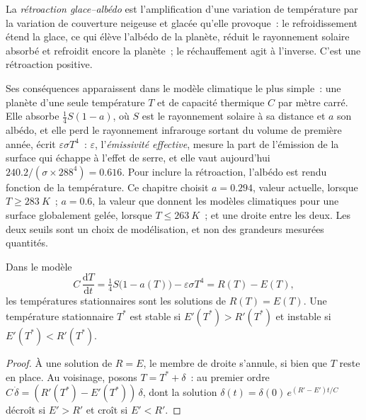 \begin{definition}\label{def:b2:precambrian-earth:ice-albedo}
La \emph{rétroaction glace--albédo} est l'amplification d'une variation
de température par la variation de couverture neigeuse et glacée qu'elle provoque~: le refroidissement étend la glace, ce qui
élève l'albédo de la planète, réduit le rayonnement solaire absorbé et refroidit encore la planète~;
le réchauffement agit à l'inverse. C'est une rétroaction positive.
\end{definition}

Ses conséquences apparaissent dans le modèle climatique le plus simple~: une planète d'une seule température $T$ et
de capacité thermique $C$ par mètre carré. Elle absorbe $\tfrac14 S(1 - a)$, où $S$ est le rayonnement solaire
à sa distance et $a$ son albédo, et elle perd le rayonnement infrarouge sortant du volume de première année, écrit
$\varepsilon\sigma T^4$~: $\varepsilon$, l'\emph{émissivité effective}, mesure la part de l'émission de la surface qui
échappe à l'effet de serre, et elle vaut aujourd'hui
$240.2/(\sigma\times288^4) = 0.616$. Pour inclure la rétroaction, l'albédo est rendu fonction de la
température. Ce chapitre choisit $a = 0.294$, valeur actuelle, lorsque $T \ge \qty{283}{K}$~; $a
= 0.6$, la valeur que donnent les modèles climatiques pour une surface globalement gelée, lorsque $T \le \qty{263}{K}$~; et
une droite entre les deux. Les deux seuils sont un choix de modélisation, et non des grandeurs mesurées
quantités.

\begin{proposition}\label{prop:b2:precambrian-earth:ebm}
Dans le modèle
\[
  C\,\frac{\mathrm dT}{\mathrm dt} = \tfrac14 S\bigl(1 - a(T)\bigr) - \varepsilon\sigma T^4
  = R(T) - E(T),
\]
les températures stationnaires sont les solutions de $R(T) = E(T)$. Une température stationnaire $T^*$ est
stable si $E'(T^*) > R'(T^*)$ et instable si $E'(T^*) < R'(T^*)$.
\end{proposition}

\begin{proof}
À une solution de $R = E$, le membre de droite s'annule, si bien que $T$ reste en place. Au voisinage, posons $T = T^*
+ \delta$~: au premier ordre $C\,\dot\delta = (R'(T^*) - E'(T^*))\,\delta$, dont la solution
$\delta(t) = \delta(0)\,e^{(R' - E')t/C}$ décroît si $E' > R'$ et croît si $E' < R'$.
\end{proof}

